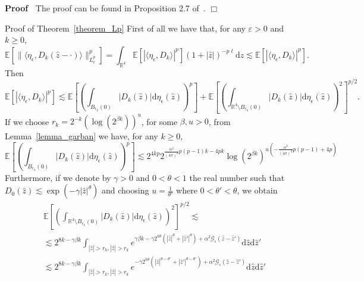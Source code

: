 \documentclass[a4paper,10pt]{article}
\newcommand{\mathd}{\mathrm{d}}
\newenvironment{proof}{\noindent\textbf{Proof\ }}{\hspace*{\fill}$\Box$\medskip}
\newenvironment{proof*}[1]{\noindent\textbf{#1\ }}{\hspace*{\fill}$\Box$\medskip}
\begin{document}
\begin{proof}
  The proof can be found in Proposition 2.7 of~{\cite{Vargas2010}}.
\end{proof}

\begin{proof*}{Proof of Theorem~\ref{theorem_Lp}}
  First of all we have that, for any $\varepsilon > 0$ and $k \geqslant 0$, \
  \
  \[ \mathbb{E} [\| \langle \eta_{\epsilon}, D_k (\hat{z} - \cdot) \rangle
     \|_{L^p_{\ell}}^p] = \int_{\mathbb{R}^4} \mathbb{E} [| \langle
     \eta_{\epsilon}, D_k \rangle |^p] (1 + | \hat{z} |)^{- p \ell} \mathd
     \hat{z} \lesssim \mathbb{E} [| \langle \eta_{\epsilon}, D_k \rangle |^p]
     . \]
  Then
  \[ \mathbb{E} [| \langle \eta_{\epsilon}, D_k \rangle |^p] \lesssim
     \mathbb{E} \left[ \left( \int_{B_{r_k} (0)} | D_k (\hat{z}) | \mathd
     \eta_{\epsilon} (\hat{z}) \right)^p \right] +\mathbb{E} \left[ \left(
     \int_{\mathbb{R}^4 \setminus B_{r_k} (0)} | D_k (\hat{z}) | \mathd
     \eta_{\epsilon} (\hat{z}) \right)^2 \right]^{p / 2} . \]
  If we choose $r_k = 2^{- k} (\log (2^{\beta k}))^u$, for some $\beta, u >
  0$, from Lemma~\ref{lemma_garban} we have, for any $k \geqslant 0$, \
  \[ \mathbb{E} \left[ \left( \int_{B_{r_k} (0)} | D_k (\hat{z}) | \mathd
     \eta_{\epsilon} (\hat{z}) \right)^p \right] \lesssim 2^{4 k p}
     2^{\frac{\alpha^2}{(4 \pi)^2} p (p - 1) k - 4 p k} \log (2^{\beta k})^{u
     \left( - \frac{\alpha^2}{(4 \pi)^2} p (p - 1) + 4 p \right)} \]
  Furthermore, if we denote by $\gamma > 0$ and $0 < \theta < 1$ the real
  number such that $D_0 (\hat{z}) \lesssim \exp (- \gamma | \hat{z}
  |^{\theta})$ and choosing $u = \frac{1}{\theta'}$ where $0 < \theta' <
  \theta$, we obtain
  \[ \begin{array}{c}
       \mathbb{E} \left[ \left( \int_{\mathbb{R}^4 \setminus B_{r_k} (0)} |
       D_k (\hat{z}) | \mathd \eta_{\epsilon} (\hat{z}) \right)^2 \right]^{p /
       2} \lesssim\\
       \lesssim 2^{8 k - \gamma \beta k} \int_{| \hat{z} | > r_k, | \hat{z} |
       > r_k} e^{\gamma \beta k - \gamma 2^{k \theta} (| \hat{z} |^{\theta} +
       | \hat{z}' |^{\theta}) + \alpha^2 \mathcal{G}_{\epsilon} (\hat{z} -
       \hat{z}')} \mathd \hat{z} \mathd \hat{z}'\\
       \lesssim 2^{8 k - \gamma \beta k} \int_{| \hat{z} | > r_k, | \hat{z} |
       > r_k} e^{- \gamma 2^{k \theta} (| \hat{z} |^{\theta - \theta'} + |
       \hat{z}' |^{\theta - \theta'}) + \alpha^2 \mathcal{G}_{\epsilon}
       (\hat{z} - \hat{z}')} \mathd \hat{z} \mathd \hat{z}'\\

\end{array}\]
\end{proof*}
\end{document}
